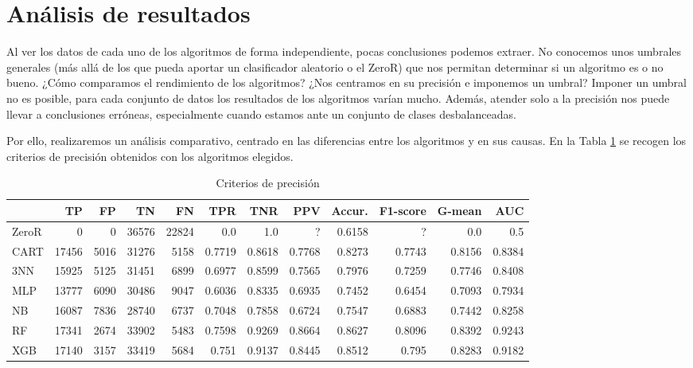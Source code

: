 \documentclass[a4paper, 20pt]{article}
\begin{document}
\section{Análisis de resultados}

Al ver los datos de cada uno de los algoritmos de forma independiente, pocas conclusiones podemos extraer. No conocemos unos umbrales generales (más allá de los que pueda aportar un clasificador aleatorio o el ZeroR) que nos permitan determinar si un algoritmo es o no bueno. ¿Cómo comparamos el rendimiento de los algoritmos? ¿Nos centramos en su precisión e imponemos un umbral? Imponer un umbral no es posible, para cada conjunto de datos los resultados de los algoritmos varían mucho. Además, atender solo a la precisión nos puede llevar a conclusiones erróneas, especialmente cuando estamos ante un conjunto de clases desbalanceadas.

Por ello, realizaremos un análisis comparativo, centrado en las diferencias entre los algoritmos y en sus causas. En la Tabla \ref{tab:global} se recogen los criterios de precisión obtenidos con los algoritmos elegidos.

\begin{table}[H]
\centering
\caption{Criterios de precisión}
\label{tab:global}
\begin{tabular}{lrrrrrrrrrrr}
\toprule
 & TP & FP & TN & FN & TPR & TNR & PPV & Accur. & F1-score & G-mean & AUC\\ \midrule
ZeroR & 0 & 0 & 36576 & 22824 & 0.0 & 1.0 & ? & 0.6158 & ? & 0.0 & 0.5\\
CART & 17456 & 5016 & 31276 & 5158 & 0.7719 & 0.8618 & 0.7768 & 0.8273 & 0.7743 & 0.8156 & 0.8384\\
3NN & 15925 & 5125 & 31451 & 6899 & 0.6977 & 0.8599 & 0.7565 & 0.7976 & 0.7259 & 0.7746 & 0.8408\\
MLP & 13777 & 6090 & 30486 & 9047 & 0.6036 & 0.8335 & 0.6935 & 0.7452 & 0.6454 & 0.7093 & 0.7934\\
NB & 16087 & 7836 & 28740 & 6737 & 0.7048 & 0.7858 & 0.6724 & 0.7547 & 0.6883 & 0.7442 & 0.8258\\
RF & 17341 & 2674 & 33902 & 5483 & 0.7598 & 0.9269 & 0.8664 & 0.8627 & 0.8096 & 0.8392 & 0.9243\\
XGB & 17140 & 3157 & 33419 & 5684 & 0.751 & 0.9137 & 0.8445 & 0.8512 & 0.795 & 0.8283 & 0.9182\\
\bottomrule
\end{tabular}
\end{table}
\end{document}

